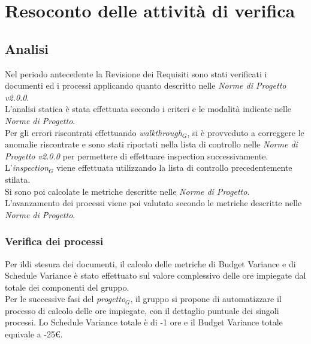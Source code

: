 \chapter{Resoconto delle attività di verifica}
\label{resoconto}
\section{Analisi}
Nel periodo antecedente la Revisione dei Requisiti sono stati verificati i documenti ed i processi applicando quanto descritto nelle \textit{Norme di Progetto v2.0.0}.\\
L'analisi statica è stata effettuata secondo i criteri e le modalità indicate nelle \textit{Norme di Progetto}.\\ 
Per gli errori riscontrati effettuando \textit{walkthrough$_{G}$}, si è provveduto a correggere le anomalie riscontrate e sono stati riportati nella lista di controllo nelle \textit{Norme di Progetto v2.0.0} per permettere di effettuare inspection successivamente.\\
L'\textit{inspection$_{G}$} viene effettuata utilizzando la lista di controllo precedentemente stilata. \\
Si sono poi calcolate le metriche descritte nelle \textit{Norme di Progetto}.\\
L'avanzamento dei processi viene poi valutato secondo le metriche descritte nelle \textit{Norme di Progetto}. 
\subsection{Verifica dei processi}
Per ildi stesura dei documenti, il calcolo delle metriche di Budget Variance e di Schedule Variance è stato effettuato sul valore complessivo delle ore impiegate dal totale dei componenti del gruppo.\\
Per le successive fasi del \textit{progetto$_{G}$}, il gruppo si propone di automatizzare il processo di calcolo delle ore impiegate, con il dettaglio puntuale dei singoli processi.
Lo Schedule Variance totale è di -1 ore e il Budget Variance totale equivale a -25\euro.

\\
